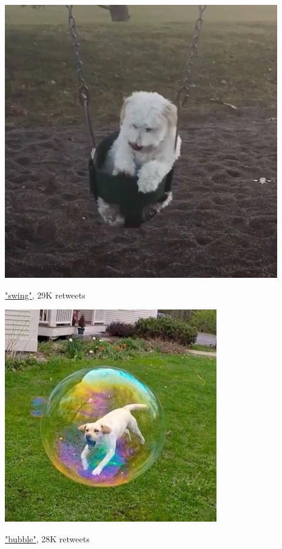 \documentclass{article}
\begin{document}
\vspace{20pt}
\begin{minipage}[t]{0.5\linewidth}

\includegraphics[width=0.99\linewidth]{error1.jpeg}

\centering \href{https://twitter.com/dog_rates/status/678399652199309312/video/1}{"swing"}, 29K retweets

\end{minipage}\hfill
\begin{minipage}[t]{0.5\linewidth}

\includegraphics[width=0.99\linewidth]{error2.jpeg}

\centering \href{https://twitter.com/dog_rates/status/676219687039057920/photo/1}{"bubble"}, 28K retweets

\end{minipage}   
\end{document}
